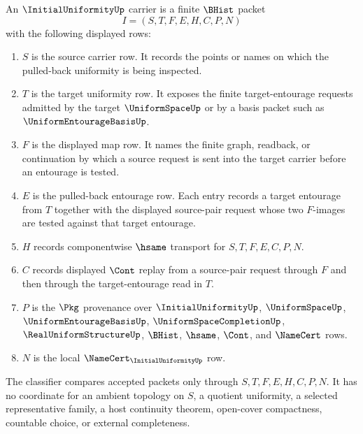\begin{definition}
\label{def:initial-uniformity-carrier}
An $\InitialUniformityUp$ carrier is a finite $\BHist$ packet
$$
I=(S,T,F,E,H,C,P,N)
$$
with the following displayed rows:
\begin{enumerate}
\item $S$ is the source carrier row. It records the points or names on which the pulled-back uniformity is being inspected.
\item $T$ is the target uniformity row. It exposes the finite target-entourage requests admitted by the target $\UniformSpaceUp$ or by a basis packet such as $\UniformEntourageBasisUp$.
\item $F$ is the displayed map row. It names the finite graph, readback, or continuation by which a source request is sent into the target carrier before an entourage is tested.
\item $E$ is the pulled-back entourage row. Each entry records a target entourage from $T$ together with the displayed source-pair request whose two $F$-images are tested against that target entourage.
\item $H$ records componentwise $\hsame$ transport for $S,T,F,E,C,P,N$.
\item $C$ records displayed $\Cont$ replay from a source-pair request through $F$ and then through the target-entourage read in $T$.
\item $P$ is the $\Pkg$ provenance over $\InitialUniformityUp$, $\UniformSpaceUp$, $\UniformEntourageBasisUp$, $\UniformSpaceCompletionUp$, $\RealUniformStructureUp$, $\BHist$, $\hsame$, $\Cont$, and $\NameCert$ rows.
\item $N$ is the local $\NameCert_{\InitialUniformityUp}$ row.
\end{enumerate}
The classifier compares accepted packets only through $S,T,F,E,H,C,P,N$. It has no coordinate for an ambient topology on $S$, a quotient uniformity, a selected representative family, a host continuity theorem, open-cover compactness, countable choice, or external completeness.
\end{definition}


